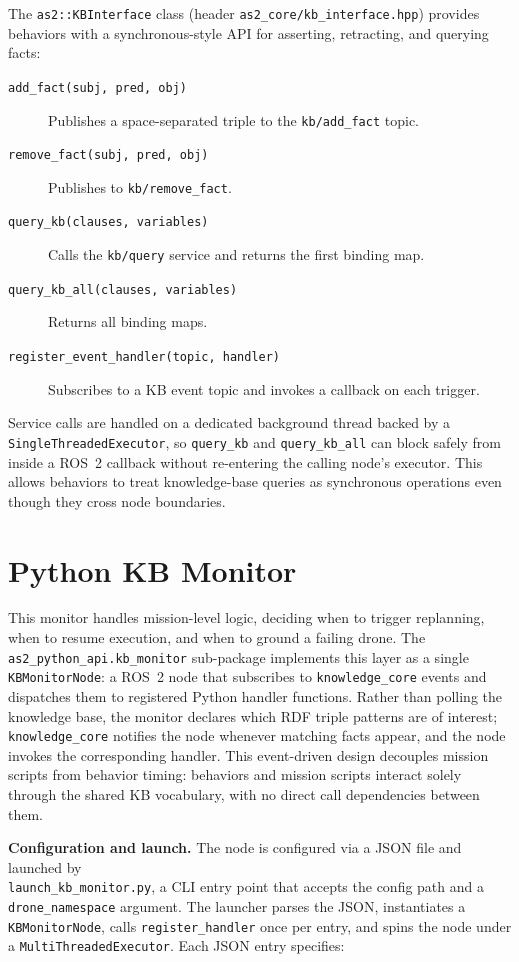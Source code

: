 \documentclass[deliverable]{csreport}
\renewcommand{\code}[1]{\texttt{\textcolor{CSMaroon}{#1}}}%
\newcommand{\tcode}[1]{\texttt{\textcolor{CSMaroon}{#1}}}
\begin{document}
The \code{as2::KBInterface} class (header \code{as2\_core/kb\_interface.hpp}) provides behaviors with a synchronous-style API for asserting, retracting, and querying facts:

\begin{description}
  \item[\tcode{add\_fact(subj, pred, obj)}] Publishes a space-separated triple to the \code{kb/add\_fact} topic.
  \item[\tcode{remove\_fact(subj, pred, obj)}] Publishes to \code{kb/remove\_fact}.
  \item[\tcode{query\_kb(clauses, variables)}] Calls the \code{kb/query} service and returns the first binding map.
  \item[\tcode{query\_kb\_all(clauses, variables)}] Returns all binding maps.
  \item[\tcode{register\_event\_handler(topic, handler)}] Subscribes to a KB event topic and invokes a callback on each trigger.
\end{description}

Service calls are handled on a dedicated background thread backed by a \code{SingleThreadedExecutor}, so \code{query\_kb} and \code{query\_kb\_all} can block safely from inside a ROS~2 callback without re-entering the calling node's executor. This allows behaviors to treat knowledge-base queries as synchronous operations even though they cross node boundaries.

\section{Python KB Monitor}

This monitor handles mission-level logic, deciding when to trigger replanning, when to resume execution, and when to ground a failing drone. The \code{as2\_python\_api.kb\_monitor} sub-package implements this layer as a single \code{KBMonitorNode}: a ROS~2 node that subscribes to \code{knowledge\_core} events and dispatches them to registered Python handler functions. Rather than polling the knowledge base, the monitor declares which RDF triple patterns are of interest; \code{knowledge\_core} notifies the node whenever matching facts appear, and the node invokes the corresponding handler. This event-driven design decouples mission scripts from behavior timing: behaviors and mission scripts interact solely through the shared KB vocabulary, with no direct call dependencies between them.

\textbf{Configuration and launch.} The node is configured via a JSON file and launched by \\ \code{launch\_kb\_monitor.py}, a CLI entry point that accepts the config path and a \code{drone\_namespace} argument. The launcher parses the JSON, instantiates a \code{KBMonitorNode}, calls \code{register\_handler} once per entry, and spins the node under a \code{MultiThreadedExecutor}. Each JSON entry specifies:
\end{document}
